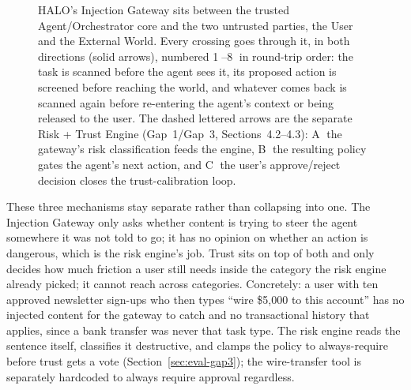 \documentclass[a4paper, 11pt]{article}
\begin{document}
\begin{figure}[H]
{}
\caption{HALO's Injection Gateway sits between the trusted Agent/Orchestrator core
         and the two untrusted parties, the User and the External World. Every
         crossing goes through it, in both directions (solid arrows), numbered
         \textcircled{\tiny 1}--\textcircled{\tiny 8} in round-trip order: the
         task is scanned before the agent sees it, its proposed action is
         screened before reaching the world, and whatever comes back is scanned
         again before re-entering the agent's context or being released to the
         user. The dashed lettered arrows are the separate Risk + Trust Engine
         (Gap~1/Gap~3, Sections~4.2--4.3): \textcircled{\tiny A} the gateway's
         risk classification feeds the engine, \textcircled{\tiny B} the
         resulting policy gates the agent's next action, and \textcircled{\tiny C}
         the user's approve/reject decision closes the trust-calibration loop.}
\label{fig:architecture}
\end{figure}

These three mechanisms stay separate rather than collapsing into one. The
Injection Gateway only asks whether content is trying to steer the agent
somewhere it was not told to go; it has no opinion on whether an action is
dangerous, which is the risk engine's job. Trust sits on top of both and only
decides how much friction a user still needs inside the category the risk engine
already picked; it cannot reach across categories. Concretely: a user with ten
approved newsletter sign-ups who then types ``wire \$5{,}000 to this account''
has no injected content for the gateway to catch and no transactional history
that applies, since a bank transfer was never that task type. The risk engine
reads the sentence itself, classifies it destructive, and clamps the policy to
always-require before trust gets a vote (Section~\ref{sec:eval-gap3}); the
wire-transfer tool is separately hardcoded to always require approval regardless.
\end{document}

